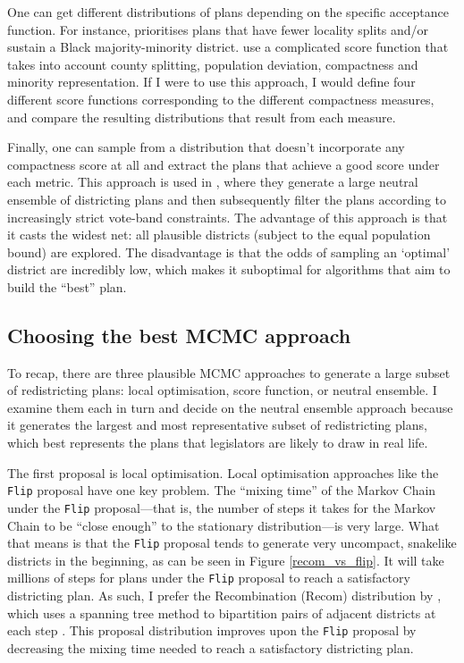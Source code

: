 \documentclass[]{article}
\begin{document}
One can get different distributions of plans depending on the specific
acceptance function. For instance, \cite{dd2019va} prioritises plans
that have fewer locality splits and/or sustain a Black majority-minority
district. \cite{h2018} use a complicated score function that takes into
account county splitting, population deviation, compactness and minority
representation. If I were to use this approach, I would define four
different score functions corresponding to the different compactness
measures, and compare the resulting distributions that result from each
measure.

Finally, one can sample from a distribution that doesn't incorporate any
compactness score at all and extract the plans that achieve a good score
under each metric. This approach is used in \cite{ddj2019comp}, where
they generate a large neutral ensemble of districting plans and then
subsequently filter the plans according to increasingly strict vote-band
constraints. The advantage of this approach is that it casts the widest
net: all plausible districts (subject to the equal population bound) are
explored. The disadvantage is that the odds of sampling an `optimal'
district are incredibly low, which makes it suboptimal for algorithms
that aim to build the ``best'' plan.

\hypertarget{choosing-the-best-mcmc-approach}{%
\subsection{Choosing the best MCMC
approach}\label{choosing-the-best-mcmc-approach}}

To recap, there are three plausible MCMC approaches to generate a large
subset of redistricting plans: local optimisation, score function, or
neutral ensemble. I examine them each in turn and decide on the neutral
ensemble approach because it generates the largest and most
representative subset of redistricting plans, which best represents the
plans that legislators are likely to draw in real life.

The first proposal is local optimisation. Local optimisation approaches
like the \texttt{Flip} proposal have one key problem. The ``mixing
time'' of the Markov Chain under the \texttt{Flip} proposal---that is,
the number of steps it takes for the Markov Chain to be ``close enough''
to the stationary distribution---is very large. What that means is that
the \texttt{Flip} proposal tends to generate very uncompact, snakelike
districts in the beginning, as can be seen in Figure
\ref{recom_vs_flip}. It will take millions of steps for plans under the
\texttt{Flip} proposal to reach a satisfactory districting plan. As
such, I prefer the Recombination (Recom) distribution by
\citeauthor{ddj2019recom}, which uses a spanning tree method to
bipartition pairs of adjacent districts at each step
\citep{ddj2019comp}. This proposal distribution improves upon the
\texttt{Flip} proposal by decreasing the mixing time needed to reach a
satisfactory districting plan.
\end{document}
